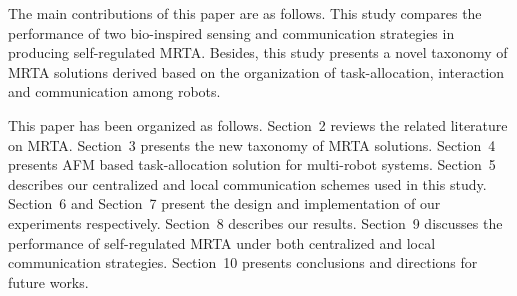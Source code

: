 \documentclass[journal]{IEEEtran}
\begin{document}
The main contributions of this paper are as follows.
This study compares the performance of two bio-inspired sensing and communication strategies in producing self-regulated MRTA.
Besides, this study presents a novel taxonomy of MRTA solutions  derived based on the organization of task-allocation, interaction and communication among robots.

This paper has been organized as follows.
Section~2 reviews the related literature on MRTA.
Section~3 presents the new taxonomy of MRTA solutions.
Section~4 presents AFM based task-allocation solution for multi-robot systems. 
Section~5  describes our centralized and local communication schemes used in this study.
Section~6 and Section~7 present the design and implementation of our experiments respectively.
Section~8 describes our results. 
Section~9 discusses the performance of self-regulated MRTA under both centralized and local communication strategies.
Section~10 presents conclusions and directions for future works.
\end{document}
